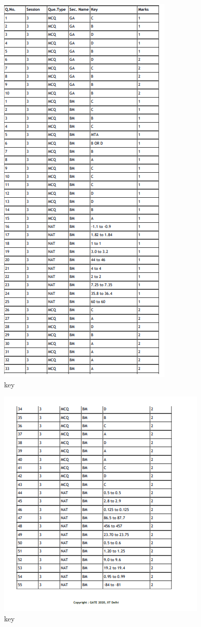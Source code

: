 \documentclass[journal,12pt,onecolumn]{IEEEtran}
\theoremstyle{remark}
\begin{document}
\begin{enumerate}
\begin{figure}[H]
\centering
\includegraphics[width=0.4\columnwidth]{Figs/fig8.png}
\caption{key}
\label{fig:placeholder}
\end{figure}

\begin{figure}[H]
\centering
\includegraphics[width=0.4\columnwidth]{Figs/fig9.png}
\caption{key}
\label{fig:placeholder}
\end{figure}




\end{enumerate}
\end{document}
